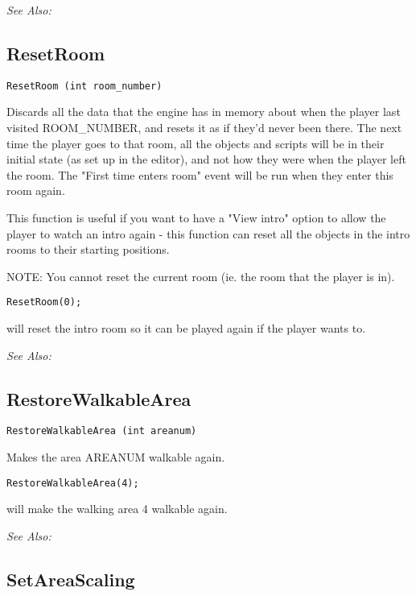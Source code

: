 \it{See Also:} 


\subsection{ResetRoom}\label{ResetRoom}%

\begin{verbatim}
ResetRoom (int room_number)
\end{verbatim}
Discards all the data that the engine has in memory about when the player
last visited ROOM_NUMBER, and resets it as if they'd never been there. The
next time the player goes to that room, all the objects and scripts will
be in their initial state (as set up in the editor), and not how they were
when the player left the room. The "First time enters room" event will be
run when they enter this room again.

This function is useful if you want to have a "View intro" option to allow
the player to watch an intro again - this function can reset all the
objects in the intro rooms to their starting positions.

NOTE: You cannot reset the current room (ie. the room that the player is in).

\begin{verbatim}
ResetRoom(0);
\end{verbatim}
will reset the intro room so it can be played again if the player wants to.

\it{See Also:} 


\subsection{RestoreWalkableArea}\label{RestoreWalkableArea}%

\begin{verbatim}
RestoreWalkableArea (int areanum)
\end{verbatim}
Makes the area AREANUM walkable again.

\begin{verbatim}
RestoreWalkableArea(4);
\end{verbatim}
will make the walking area 4 walkable again.

\it{See Also:} 


\subsection{SetAreaScaling}\label{SetAreaScaling}%

